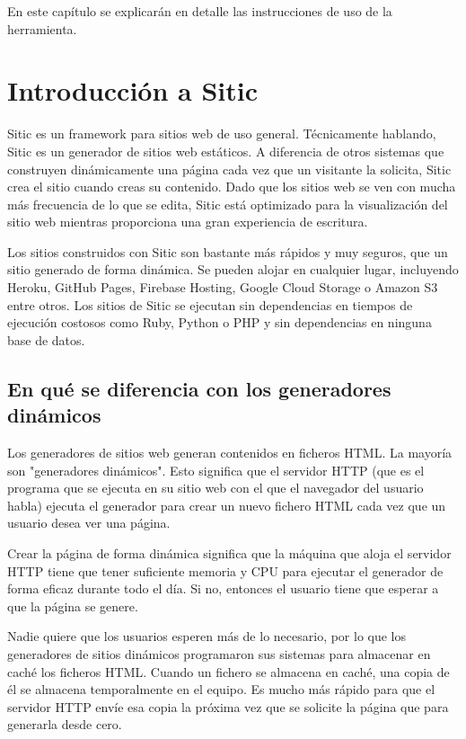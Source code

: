 En este capítulo se explicarán en detalle las instrucciones de uso de la herramienta.

\section{Introducción a Sitic}

Sitic es un framework para sitios web de uso general. Técnicamente hablando, Sitic es un generador de sitios web estáticos.
A diferencia de otros sistemas que construyen dinámicamente una página cada vez que un visitante la solicita, Sitic crea el sitio
cuando creas su contenido. Dado que los sitios web se ven con mucha más frecuencia de lo que se edita,
Sitic está optimizado para la visualización del sitio web mientras proporciona una gran experiencia de escritura.

Los sitios construidos con Sitic son bastante más rápidos y muy seguros, que un sitio generado de forma dinámica.
Se pueden alojar en cualquier lugar, incluyendo Heroku, GitHub Pages, Firebase Hosting, Google Cloud Storage o Amazon
S3 entre otros. Los sitios de Sitic se ejecutan sin dependencias en tiempos de ejecución costosos como Ruby, Python
o PHP y sin dependencias en ninguna base de datos.

\subsection{En qué se diferencia con los generadores dinámicos}

Los generadores de sitios web generan contenidos en ficheros HTML. La mayoría son "generadores dinámicos".
Esto significa que el servidor HTTP (que es el programa que se ejecuta en su sitio web con el que el navegador del
usuario habla) ejecuta el generador para crear un nuevo fichero HTML cada vez que un usuario desea ver una página.

Crear la página de forma dinámica significa que la máquina que aloja el servidor HTTP tiene que tener suficiente
memoria y CPU para ejecutar el generador de forma eficaz durante todo el día. Si no, entonces el usuario tiene que
esperar a que la página se genere.

Nadie quiere que los usuarios esperen más de lo necesario, por lo que los generadores de sitios dinámicos programaron
sus sistemas para almacenar en caché los ficheros HTML. Cuando un fichero se almacena en caché, una copia de él se
almacena temporalmente en el equipo. Es mucho más rápido para que el servidor HTTP envíe esa copia la próxima vez que
se solicite la página que para generarla desde cero.

